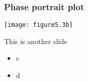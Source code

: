 \documentclass{beamer-control}
\begin{document}
\begin{frame}
\frametitle{Phase portrait plot}
\texttt{[image: figure5.3b]}

\end{frame}


\begin{frame}{This is another slide}
\begin{itemize}
\item c
\item d
\end{itemize}
\end{frame}


\SUMMARYFRAME
\FINALE
\end{document}
